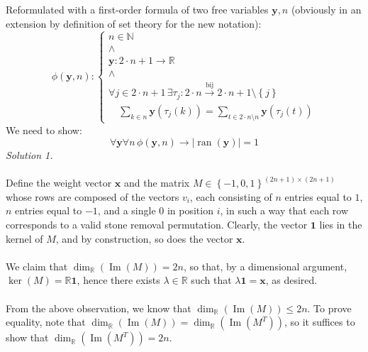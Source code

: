 \begin{solution}
    Reformulated with a first-order formula of two free variables \( \mathbf{y}, n \) (obviously in an extension by definition of set theory for the new notation):
    \[
        \phi\left(\mathbf{y}, n\right):\begin{cases}
            n \in \mathbb{N} \\
            \wedge \\
            \mathbf{y}: 2 \cdot n + 1 \to \mathbb{R} \\
            \wedge \\
            \forall j \in 2 \cdot n + 1 \, \exists \tau_j: 2 \cdot n \overset{\text{bij}}{\rightarrow} 2 \cdot n + 1 \setminus \left\{j\right\} \\
            \quad \sum_{k \in n} \mathbf{y}\left(\tau_j\left(k\right)\right) = \sum_{t \in 2 \cdot n \setminus n} \mathbf{y}\left(\tau_j\left(t\right)\right)
        \end{cases}
    \]
    We need to show:
    \[
        \forall \mathbf{y} \forall n \, \phi\left(\mathbf{y}, n\right) \rightarrow | \operatorname{ran}\left(\mathbf{y}\right) | = 1
    \]
    \textit{Solution 1.}
    \\\\
    Define the weight vector \( \mathbf{x} \) and the matrix \( M \in \left\{-1, 0, 1\right\}^{\left(2n+1\right) \times \left(2n+1\right)} \) whose rows are composed of the vectors \( v_i \), each consisting of \( n \) entries equal to \( 1 \), \( n \) entries equal to \( -1 \), and a single \( 0 \) in position \( i \), in such a way that each row corresponds to a valid stone removal permutation. Clearly, the vector \( \mathbf{1} \) lies in the kernel of \( M \), and by construction, so does the vector \( \mathbf{x} \).
    \\\\
    We claim that \( \dim_{\mathbb{R}}\left(\operatorname{Im}\left(M\right)\right) = 2n \), so that, by a dimensional argument, \( \ker\left(M\right) = \mathbb{R} \mathbf{1} \), hence there exists \( \lambda \in \mathbb{R} \) such that \( \lambda \mathbf{1} = \mathbf{x} \), as desired.
    \\\\
    From the above observation, we know that \( \dim_{\mathbb{R}}\left(\operatorname{Im}\left(M\right)\right) \leq 2n \). To prove equality, note that \( \dim_{\mathbb{R}}\left(\operatorname{Im}\left(M\right)\right) = \dim_{\mathbb{R}}\left(\operatorname{Im}\left(M^T\right)\right) \), so it suffices to show that \( \dim_{\mathbb{R}}\left(\operatorname{Im}\left(M^T\right)\right) = 2n \).

\end{solution}
